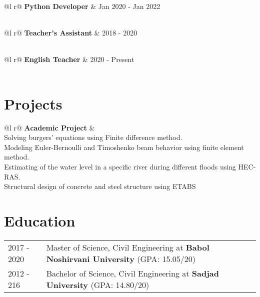 \documentclass[a4paper,12pt]{article}
\begin{document}
\begin{tabularx}{\linewidth}{ @{}l r@{} }
\textbf{Python Developer} & \hfill Jan 2020 - Jan 2022 \\[3.75pt]
  \\
\end{tabularx}
\begin{tabularx}{\linewidth}{ @{}l r@{} }
\textbf{Teacher's Assistant} & \hfill  2018 - 2020 \\[3.75pt]
  \\
\end{tabularx}
\begin{tabularx}{\linewidth}{ @{}l r@{} }
\textbf{English Teacher} & \hfill  2020 - Present \\[3.75pt]
  \\
\end{tabularx}

\section{Projects}

\begin{tabularx}{\linewidth}{ @{}l r@{} }
\textbf{Academic Project} & \hfill  \\[3.75pt]
{Solving burgers’ equations using Finite difference method.}\\        
{Modeling Euler-Bernoulli and Timoshenko beam behavior using finite element method}.\\
{Estimating of the water level in a specific river during different floods using HEC-RAS.}  \\
{Structural design of concrete and steel structure using ETABS}\\
\end{tabularx}

\section{Education}
\begin{tabularx}{\linewidth}{@{}l X@{}}	
2017 - 2020 & Master of Science, Civil Engineering  at \textbf{Babol Noshirvani University} \hfill \normalsize (GPA: 15.05/20) \\


2012 - 216 & Bachelor of Science, Civil Engineering at \textbf{Sadjad University} \hfill (GPA: 14.80/20) \\ 

\end{tabularx}
\end{document}
